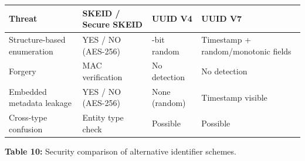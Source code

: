 \documentclass[fleqn,10pt]{wlpeerj}
\newcounter{none} %
\begin{document}
{\def\LTcaptype{none} %
\begin{longtable}[]{@{}
  >{\raggedright\arraybackslash}p{}
  >{\raggedright\arraybackslash}p{}
  >{\raggedright\arraybackslash}p{}
  >{\raggedright\arraybackslash}p{}@{}}
\toprule\noalign{}
\begin{minipage}[b]{\linewidth}\raggedright
Threat
\end{minipage} & \begin{minipage}[b]{\linewidth}\raggedright
SKEID / Secure SKEID
\end{minipage} & \begin{minipage}[b]{\linewidth}\raggedright
UUID V4
\end{minipage} & \begin{minipage}[b]{\linewidth}\raggedright
UUID V7
\end{minipage} \\
\midrule\noalign{}
\endhead
\bottomrule\noalign{}
\endlastfoot
Structure-based enumeration & YES / NO (AES-256) & 122-bit random &
Timestamp + random/monotonic fields \\
Forgery & MAC verification & No detection & No detection \\
Embedded metadata leakage & YES / NO (AES-256) & None (random) &
Timestamp visible \\
Cross-type confusion & Entity type check & Possible & Possible \\
\end{longtable}
}

\textbf{Table 10:} Security comparison of alternative identifier
schemes.
\end{document}
